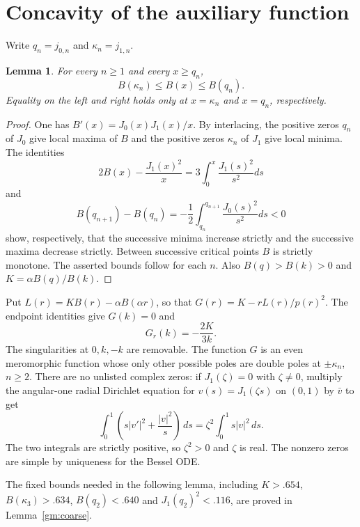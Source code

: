 \documentclass[11pt]{article}
\newtheorem{lemma}[theorem]{Lemma}
\theoremstyle{remark}
\begin{document}
\section{Concavity of the auxiliary function}\label{sec:G}
Write $q_n=j_{0,n}$ and $\kappa_n=j_{1,n}$.
\begin{lemma}\label{ev:Benvelope}
For every $n\ge1$ and every $x\ge q_n$,
\[
 B(\kappa_n)\le B(x)\le B(q_n).
\]
Equality on the left and right holds only at $x=\kappa_n$ and $x=q_n$,
respectively.
\end{lemma}
\begin{proof}
One has $B'(x)=J_0(x)J_1(x)/x$. By interlacing, the positive zeros
$q_n$ of $J_0$ give local maxima of $B$ and the positive zeros $\kappa_n$
of $J_1$ give local minima. The identities
\[
 2B(x)-\frac{J_1(x)^2}{x}
       =3\int_0^x\frac{J_1(s)^2}{s^2}ds
\]
and
\[
 B(q_{n+1})-B(q_n)
   =-\frac12\int_{q_n}^{q_{n+1}}\frac{J_0(s)^2}{s^2}ds<0
\]
show, respectively, that the successive minima increase strictly and
the successive maxima decrease strictly. Between successive critical
points $B$ is strictly monotone. The asserted bounds follow for each $n$. Also $B(q)>B(k)>0$ and
$K=\alpha B(q)/B(k)$.
\end{proof}

Put $L(r)=KB(r)-\alpha B(\alpha r)$, so that
$G(r)=K-rL(r)/p(r)^2$. The endpoint identities give $G(k)=0$ and
\begin{equation}\label{gm:endslope}
 G_r(k)=-\frac{2K}{3k}.
\end{equation}
The singularities at $0,k,-k$ are removable. The function $G$ is an
even meromorphic function whose only other possible poles are double
poles at $\pm\kappa_n$, $n\ge2$. There are no unlisted complex zeros:
if $J_1(\zeta)=0$ with $\zeta\ne0$, multiply the angular-one radial
Dirichlet equation for $v(s)=J_1(\zeta s)$ on $(0,1)$ by $\bar v$ to get
\[
 \int_0^1\left(s|v'|^2+\frac{|v|^2}s\right)\,ds
 =\zeta^2\int_0^1s|v|^2\,ds.
\]
The two integrals are strictly positive, so $\zeta^2>0$ and
$\zeta$ is real. The nonzero
zeros are simple by uniqueness for the Bessel ODE.

The fixed bounds needed in the following lemma, including
$K>.654$, $B(\kappa_3)>.634$, $B(q_2)<.640$ and
$J_1(q_2)^2<.116$, are proved in Lemma~\ref{gm:coarse}.
\end{document}
